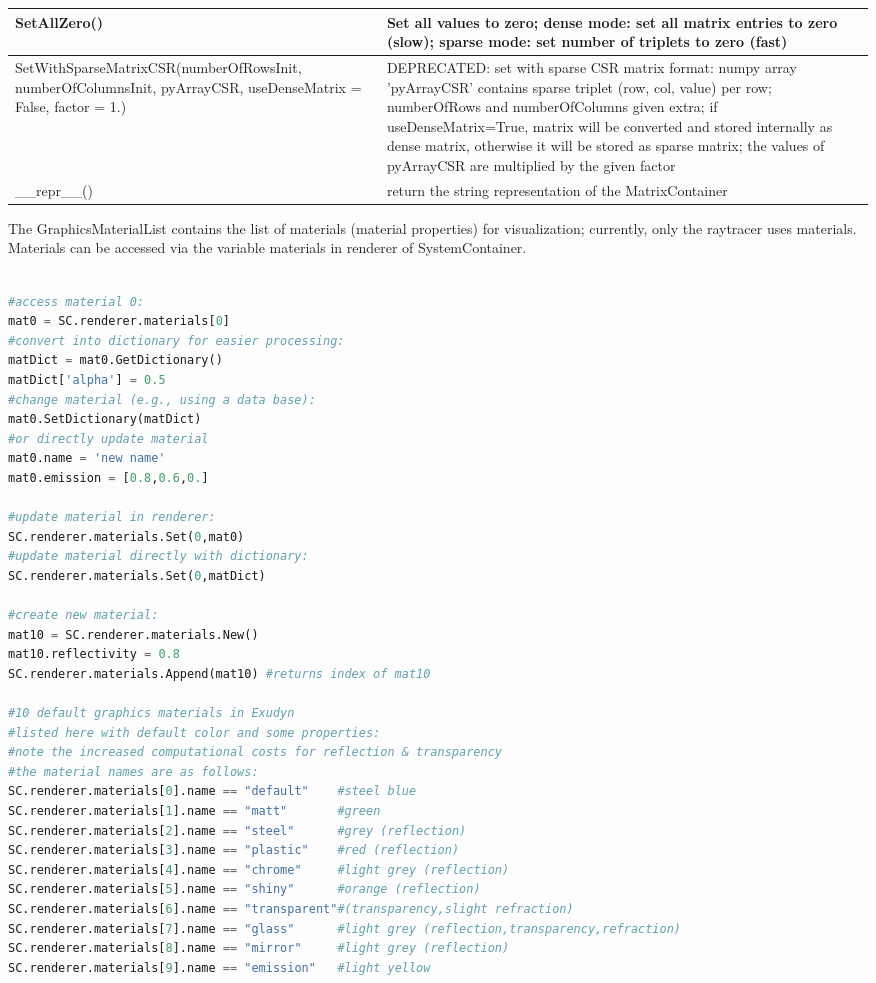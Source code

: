 \begin{center}
\begin{longtable}{| p{8cm} | p{8cm} |}
  SetAllZero() & Set all values to zero; dense mode: set all matrix entries to zero (slow); sparse mode: set number of triplets to zero (fast)\\ \hline 
  SetWithSparseMatrixCSR(numberOfRowsInit, numberOfColumnsInit, pyArrayCSR, useDenseMatrix = False, factor = 1.) & DEPRECATED: set with sparse CSR matrix format: numpy array 'pyArrayCSR' contains sparse triplet (row, col, value) per row; numberOfRows and numberOfColumns given extra; if useDenseMatrix=True, matrix will be converted and stored internally as dense matrix, otherwise it will be stored as sparse matrix; the values of pyArrayCSR are multiplied by the given factor\\ \hline 
  \_\_repr\_\_() & return the string representation of the MatrixContainer\\ \hline 
\end{longtable}
\end{center}

\label{sec:GraphicsMaterialList}
The GraphicsMaterialList contains the list of materials (material properties) for visualization; currently, only the raytracer uses materials. Materials can be accessed via the variable materials in renderer of SystemContainer.

\pythonstyle
\begin{lstlisting}[language=Python, firstnumber=1]

#access material 0:
mat0 = SC.renderer.materials[0]
#convert into dictionary for easier processing:
matDict = mat0.GetDictionary()
matDict['alpha'] = 0.5
#change material (e.g., using a data base):
mat0.SetDictionary(matDict)
#or directly update material
mat0.name = 'new name'
mat0.emission = [0.8,0.6,0.]

#update material in renderer:
SC.renderer.materials.Set(0,mat0)
#update material directly with dictionary:
SC.renderer.materials.Set(0,matDict)

#create new material:
mat10 = SC.renderer.materials.New()
mat10.reflectivity = 0.8
SC.renderer.materials.Append(mat10) #returns index of mat10

#10 default graphics materials in Exudyn
#listed here with default color and some properties:
#note the increased computational costs for reflection & transparency
#the material names are as follows:
SC.renderer.materials[0].name == "default"    #steel blue
SC.renderer.materials[1].name == "matt"       #green
SC.renderer.materials[2].name == "steel"      #grey (reflection)
SC.renderer.materials[3].name == "plastic"    #red (reflection)
SC.renderer.materials[4].name == "chrome"     #light grey (reflection)
SC.renderer.materials[5].name == "shiny"      #orange (reflection)
SC.renderer.materials[6].name == "transparent"#(transparency,slight refraction)
SC.renderer.materials[7].name == "glass"      #light grey (reflection,transparency,refraction)
SC.renderer.materials[8].name == "mirror"     #light grey (reflection)
SC.renderer.materials[9].name == "emission"   #light yellow

\end{lstlisting}

